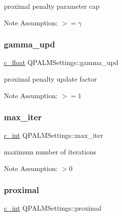 proximal penalty parameter cap 

\begin{DoxyNote}{Note}
Assumption\+: $>=\gamma$ 
\end{DoxyNote}
\mbox{\label{structQPALMSettings_a0053f0fe21f4ac5329ee49d937f645a2}} 
\subsubsection{\texorpdfstring{gamma\_upd}{gamma\_upd}}
{\footnotesize\ttfamily \mbox{\hyperlink{global__opts_8h_a7f1a9fda95e52979658c20a0d134fb15}{c\+\_\+float}} Q\+P\+A\+L\+M\+Settings\+::gamma\+\_\+upd}



proximal penalty update factor 

\begin{DoxyNote}{Note}
Assumption\+: $>=1$ 
\end{DoxyNote}
\mbox{\label{structQPALMSettings_abde94c03c9e4331e2ec9939746653371}} 
\subsubsection{\texorpdfstring{max\_iter}{max\_iter}}
{\footnotesize\ttfamily \mbox{\hyperlink{global__opts_8h_aa3217a0f49d3e52b74e9dd830c44472f}{c\+\_\+int}} Q\+P\+A\+L\+M\+Settings\+::max\+\_\+iter}



maximum number of iterations 

\begin{DoxyNote}{Note}
Assumption\+: $>0$ 
\end{DoxyNote}
\mbox{\label{structQPALMSettings_a11c44b1eb59c00cb640da78d1606cdf5}} 
\subsubsection{\texorpdfstring{proximal}{proximal}}
{\footnotesize\ttfamily \mbox{\hyperlink{global__opts_8h_aa3217a0f49d3e52b74e9dd830c44472f}{c\+\_\+int}} Q\+P\+A\+L\+M\+Settings\+::proximal}



